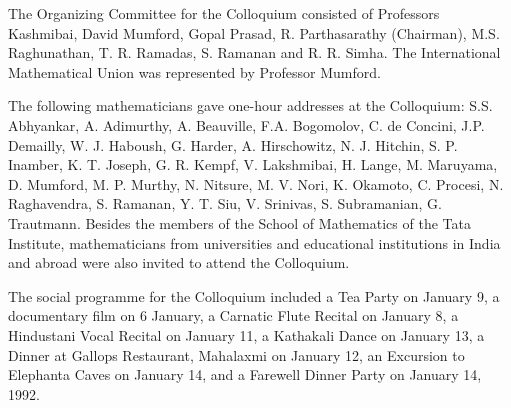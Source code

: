 The Organizing Committee for the Colloquium consisted of Professors Kashmibai, David Mumford, Gopal Prasad, R. Parthasarathy (Chairman), M.S. Raghunathan, T. R. Ramadas, S. Ramanan and R. R. Simha. The International Mathematical Union was represented by Professor Mumford.

The following mathematicians gave one-hour addresses at the Colloquium: S.S. Abhyankar, A. Adimurthy, A. Beauville, F.A. Bogomolov, C. de Concini, J.P. Demailly, W. J. Haboush, G. Harder, A. Hirschowitz, N. J. Hitchin, S. P. Inamber, K. T. Joseph, G. R. Kempf, V. Lakshmibai, H. Lange, M. Maruyama, D. Mumford, M. P. Murthy, N. Nitsure, M. V. Nori, K. Okamoto, C. Procesi, N. Raghavendra, S. Ramanan, Y. T. Siu, V. Srinivas, S. Subramanian, G. Trautmann. Besides the members of the School of Mathematics of the Tata Institute, mathematicians from universities and educational institutions in India and abroad were also invited to attend the Colloquium.

\newpage

The social programme for the Colloquium included a Tea Party on January 9, a documentary film on 6 January, a Carnatic Flute Recital on January 8, a Hindustani Vocal Recital on January 11, a Kathakali Dance on January 13, a Dinner at Gallops Restaurant, Mahalaxmi on January 12, an Excursion to Elephanta Caves on January 14, and a Farewell Dinner Party on January 14, 1992.
